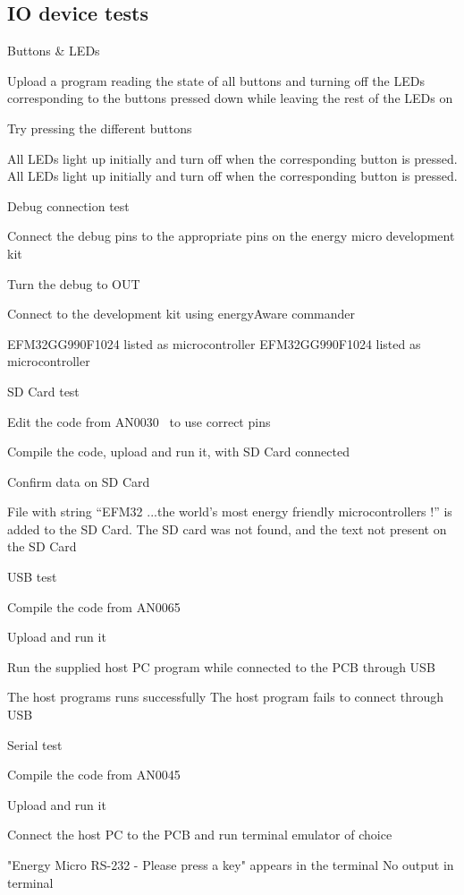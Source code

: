 \subsection{IO device tests} \label{iotest}
\test
{Buttons \& LEDs}{
    \item{Upload a program reading the state of all buttons and turning off the LEDs corresponding to the buttons pressed down while leaving the rest of the LEDs on}
    \item{Try pressing the different buttons}
}{All LEDs light up initially and turn off when the corresponding button is pressed.}
{All LEDs light up initially and turn off when the corresponding button is pressed.}

\test
{Debug connection test}{
    \item{Connect the debug pins to the appropriate pins on the energy micro development kit}
    \item{Turn the debug to OUT}
    \item{Connect to the development kit using energyAware commander}
}{EFM32GG990F1024 listed as microcontroller}
{EFM32GG990F1024 listed as microcontroller}

\test
{SD Card test}{
    \item{Edit the code from AN0030~\cite{an0030} to use correct pins}
    \item{Compile the code, upload and run it, with SD Card connected}
    \item{Confirm data on SD Card}
}{File with string ``EFM32 ...the world's most energy friendly microcontrollers !'' is added to the SD Card.}
{The SD card was not found, and the text not present on the SD Card}

\test
{USB test}{
    \item{Compile the code from AN0065~\cite{an0065}}
    \item{Upload and run it}
    \item{Run the supplied host PC program while connected to the PCB through USB}
}{The host programs runs successfully}
{The host program fails to connect through USB}

\test
{Serial test}{
    \item{Compile the code from AN0045~\cite{an0045}}
    \item{Upload and run it}
    \item{Connect the host PC to the PCB and run terminal emulator of choice}
}{"Energy Micro RS-232 - Please press a key" appears in the terminal}
{No output in terminal}

